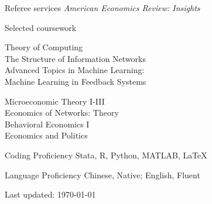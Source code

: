 \documentclass{resume} %
\begin{document}
\begin{rSection}{Referee services}
\emph{American Economics Review: Insights}
\end{rSection}


\begin{rSection}{Selected coursework}
\begin{minipage}[t]{0.5\textwidth}
Theory of Computing \\
The Structure of Information Networks \\
Advanced Topics in Machine Learning: \\
\-\hspace{1em} Machine Learning in Feedback Systems
\end{minipage}
\begin{minipage}[t]{0.5\textwidth}
Microeconomic Theory I-III\\
Economics of Networks: Theory\\
Behavioral Economics I \\
Economics and Politics
\end{minipage}


\end{rSection}



\begin{rSection}{Coding Proficiency}
Stata, R, Python, MATLAB, \LaTeX 

\end{rSection}


\begin{rSection}{Language Proficiency} 
Chinese, Native; English, Fluent

\end{rSection}

\bigskip 
\centering 
Last updated: \monthyeardate\today 
\end{document}
